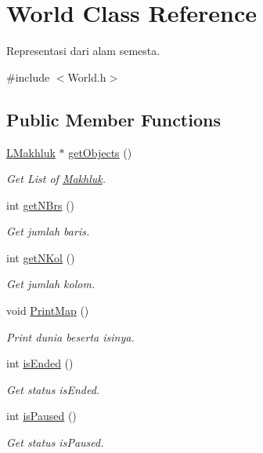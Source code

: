 \hypertarget{class_world}{}\section{World Class Reference}
\label{class_world}


Representasi dari alam semesta.  




{\ttfamily \#include $<$World.\+h$>$}

\subsection*{Public Member Functions}
\begin{DoxyCompactItemize}
\item 
\hyperlink{class_l_makhluk}{L\+Makhluk} $\ast$ \hyperlink{class_world_af9625fa1995e0c3bbdb3e6e7d48effa2}{get\+Objects} ()
\begin{DoxyCompactList}\small\item\em Get List of \hyperlink{class_makhluk}{Makhluk}. \end{DoxyCompactList}\item 
int \hyperlink{class_world_ab77dab54a1e3e7b5657b39f05cb0d2a5}{get\+N\+Brs} ()
\begin{DoxyCompactList}\small\item\em Get jumlah baris. \end{DoxyCompactList}\item 
int \hyperlink{class_world_a2d8ed3b33860324182e773fde59832b2}{get\+N\+Kol} ()
\begin{DoxyCompactList}\small\item\em Get jumlah kolom. \end{DoxyCompactList}\item 
void \hyperlink{class_world_ab166a5835416154c7276dcfa8c523e2e}{Print\+Map} ()
\begin{DoxyCompactList}\small\item\em Print dunia beserta isinya. \end{DoxyCompactList}\item 
int \hyperlink{class_world_acd627d79b89688184df6e9601ffe1532}{is\+Ended} ()
\begin{DoxyCompactList}\small\item\em Get status is\+Ended. \end{DoxyCompactList}\item 
int \hyperlink{class_world_ad06b05aabbcbe0c93106793bdb5fcc2c}{is\+Paused} ()
\begin{DoxyCompactList}\small\item\em Get status is\+Paused. \end{DoxyCompactList}\item 

\end{DoxyCompactItemize}
